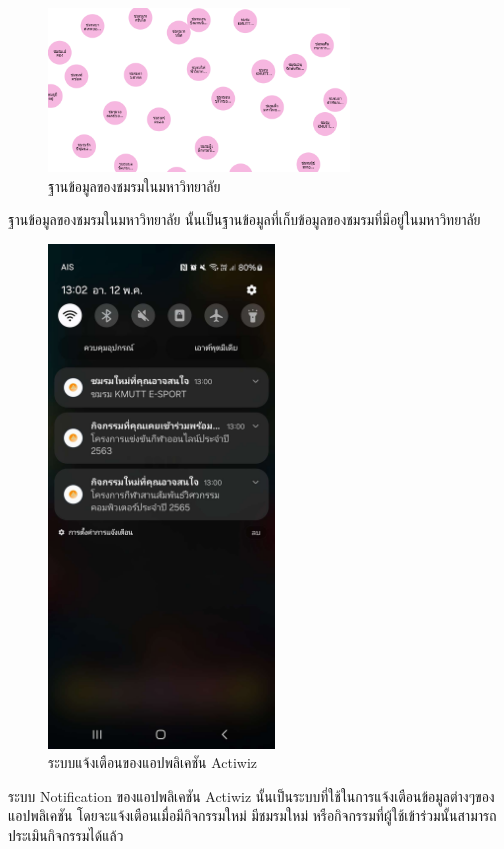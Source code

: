 \documentclass[14pt,oneside,openright,a4paper]{cpe-thai-project}
\begin{document}
\begin{figure}[!h]\centering
  \includegraphics[width=8cm]{./Pictures/club.png}
  \caption{ฐานข้อมูลของชมรมในมหาวิทยาลัย}\label{fig:DatabaseClub}
\end{figure}
  \hspace*{1cm} ฐานข้อมูลของชมรมในมหาวิทยาลัย นั้นเป็นฐานข้อมูลที่เก็บข้อมูลของชมรมที่มีอยู่ในมหาวิทยาลัย 

\begin{figure}[!h]\centering
  \includegraphics[width=6cm]{./Pictures/NotificationPage.jpg}
  \caption{ระบบแจ้งเตือนของแอปพลิเคชัน Actiwiz}\label{fig:NotificationPage}
\end{figure}
  \hspace*{1cm} ระบบ Notification ของแอปพลิเคชัน Actiwiz นั้นเป็นระบบที่ใช้ในการแจ้งเตือนข้อมูลต่างๆของแอปพลิเคชัน โดยจะแจ้งเตือนเมื่อมีกิจกรรมใหม่ 
  มีชมรมใหม่ หรือกิจกรรมที่ผู้ใช้เข้าร่วมนั้นสามารถประเมินกิจกรรมได้แล้ว
\newpage
\end{document}
